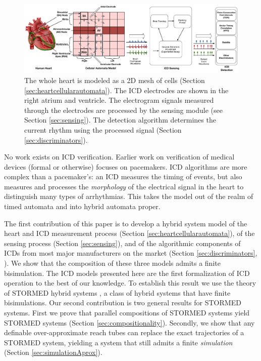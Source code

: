 \begin{figure}[t]
	\centering
	\vspace{-10pt}
	\includegraphics[scale=0.28]{figures/overviewFigure}
	\vspace{-10pt}
	\caption{\small The whole heart is modeled as a 2D mesh of cells (Section \ref{sec:heartcellularautomata}). The \ac{ICD} electrodes are shown in the right atrium and ventricle. The electrogram signals measured through the electrodes are processed by the sensing module (see Section \ref{sec:sensing}). The detection algorithm determines the current rhythm using the processed signal (Section \ref{sec:discriminators}).}
	\label{fig:overview}
	\vspace{-10pt}
\end{figure}
No work exists on \ac{ICD} verification. 
Earlier work on verification of medical devices (formal or otherwise) focuses on pacemakers.
\ac{ICD} algorithms are more complex than a pacemaker's: an \ac{ICD} measures the timing of events, but also measures and processes the \emph{morphology} of the electrical signal in the heart to distinguish many types of arrhythmias.
This takes the model out of the realm of timed automata and into hybrid automata proper.

The first contribution of this paper is to develop a hybrid system model of the heart and \ac{ICD} measurement process (Section \ref{sec:heartcellularautomata}), 
of the sensing process (Section \ref{sec:sensing}),
and of the algorithmic components of \acp{ICD} from most major manufacturers on the market (Section \ref{sec:discriminators}, ).
We show that the composition of these three models admits a finite bisimulation.
The \ac{ICD} models presented here are the first formalization of \ac{ICD} operation to the best of our knowledge.
To establish this result we use the theory of STORMED hybrid systems \cite{VladimerouPVD08_STORMED}, a class of hybrid systems that have finite bisimulations.
Our second contribution is two general results for STORMED systems.
First we prove that parallel compositions of STORMED systems yield STORMED systems (Section \ref{sec:compositionality}).
Secondly, we show that any definable over-approximate reach tubes can replace the exact trajectories of a STORMED system, yielding a system that still admits a finite \emph{simulation} (Section \ref{sec:simulationAprox}). 
